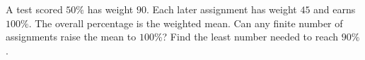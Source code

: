 A test scored $50\%$ has weight $90$. Each later assignment has weight $45$ and earns $100\%$. The overall percentage is the weighted mean. Can any finite number of assignments raise the mean to $100\%$? Find the least number needed to reach $90\%$.
